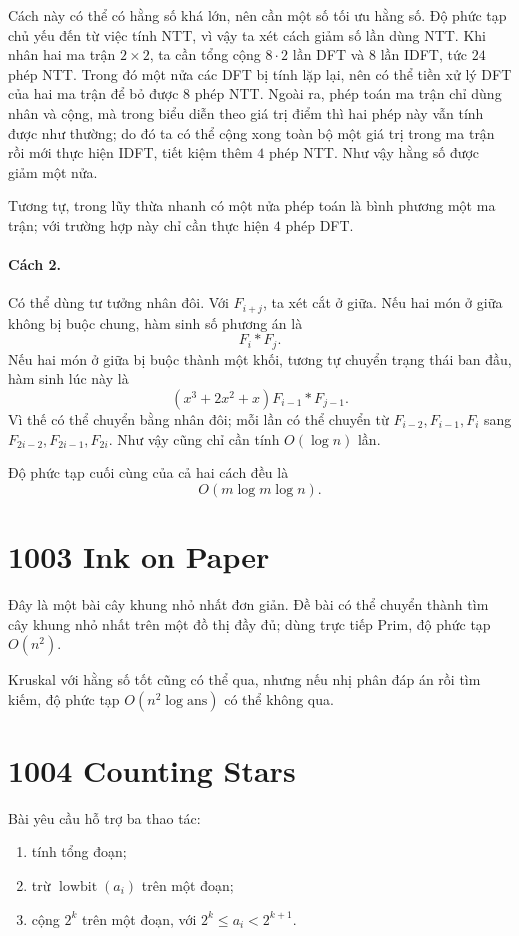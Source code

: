 \documentclass[11pt]{article}
\begin{document}
Cách này có thể có hằng số khá lớn, nên cần một số tối ưu hằng số. Độ phức
tạp chủ yếu đến từ việc tính NTT, vì vậy ta xét cách giảm số lần dùng NTT.
Khi nhân hai ma trận $2\times 2$, ta cần tổng cộng $8\cdot 2$ lần DFT và
$8$ lần IDFT, tức $24$ phép NTT. Trong đó một nửa các DFT bị tính lặp lại, nên
có thể tiền xử lý DFT của hai ma trận để bỏ được $8$ phép NTT. Ngoài ra, phép
toán ma trận chỉ dùng nhân và cộng, mà trong biểu diễn theo giá trị điểm thì
hai phép này vẫn tính được như thường; do đó ta có thể cộng xong toàn bộ một
giá trị trong ma trận rồi mới thực hiện IDFT, tiết kiệm thêm $4$ phép NTT. Như
vậy hằng số được giảm một nửa.

Tương tự, trong lũy thừa nhanh có một nửa phép toán là bình phương một ma
trận; với trường hợp này chỉ cần thực hiện $4$ phép DFT.

\paragraph{Cách 2.}
Có thể dùng tư tưởng nhân đôi. Với $F_{i+j}$, ta xét cắt ở giữa. Nếu hai món
ở giữa không bị buộc chung, hàm sinh số phương án là
\[
  F_i * F_j.
\]
Nếu hai món ở giữa bị buộc thành một khối, tương tự chuyển trạng thái ban đầu,
hàm sinh lúc này là
\[
  (x^3+2x^2+x)F_{i-1} * F_{j-1}.
\]
Vì thế có thể chuyển bằng nhân đôi; mỗi lần có thể chuyển từ
$F_{i-2},F_{i-1},F_i$ sang $F_{2i-2},F_{2i-1},F_{2i}$. Như vậy cũng chỉ cần
tính $O(\log n)$ lần.

Độ phức tạp cuối cùng của cả hai cách đều là
\[
  O(m\log m\log n).
\]

\section*{1003 Ink on Paper}

Đây là một bài cây khung nhỏ nhất đơn giản. Đề bài có thể chuyển thành tìm cây
khung nhỏ nhất trên một đồ thị đầy đủ; dùng trực tiếp Prim, độ phức tạp
$O(n^2)$.

Kruskal với hằng số tốt cũng có thể qua, nhưng nếu nhị phân đáp án rồi tìm
kiếm, độ phức tạp $O(n^2\log\mathrm{ans})$ có thể không qua.

\section*{1004 Counting Stars}

Bài yêu cầu hỗ trợ ba thao tác:
\begin{enumerate}
  \item tính tổng đoạn;
  \item trừ $\operatorname{lowbit}(a_i)$ trên một đoạn;
  \item cộng $2^k$ trên một đoạn, với $2^k\le a_i<2^{k+1}$.
\end{enumerate}
\end{document}
